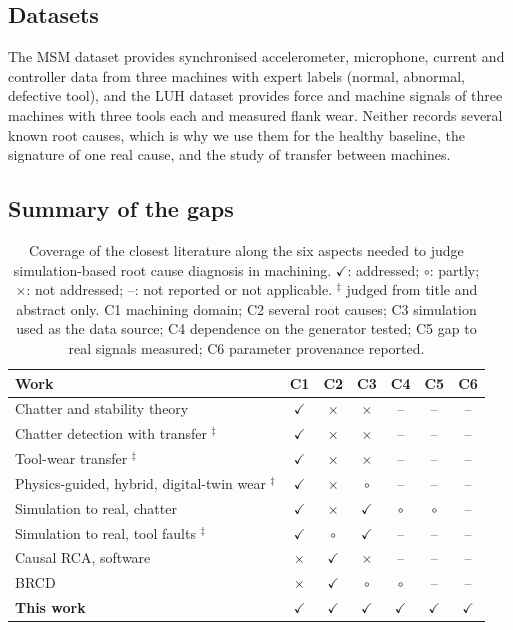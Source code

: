 \documentclass[11pt]{article}
\newcommand{\cmark}{$\checkmark$}
\newcommand{\xmark}{$\times$}
\newcommand{\pmark}{$\circ$}
\begin{document}
\subsection{Datasets}
The MSM dataset \citep{kim2026msm} provides synchronised accelerometer, microphone, current and controller data from three machines with expert labels (normal, abnormal, defective tool), and the LUH dataset \citep{denkena2023luh} provides force and machine signals of three machines with three tools each and measured flank wear.
Neither records several known root causes, which is why we use them for the healthy baseline, the signature of one real cause, and the study of transfer between machines.

\subsection{Summary of the gaps}
\begin{table}[t]\centering\footnotesize
\caption{Coverage of the closest literature along the six aspects needed to judge simulation-based root cause diagnosis in machining. \cmark: addressed; \pmark: partly; \xmark: not addressed; --: not reported or not applicable. $^{\ddagger}$ judged from title and abstract only. C1 machining domain; C2 several root causes; C3 simulation used as the data source; C4 dependence on the generator tested; C5 gap to real signals measured; C6 parameter provenance reported.}\label{tab:gap}
\begin{tabular}{p{5.6cm}cccccc}\toprule
Work & C1 & C2 & C3 & C4 & C5 & C6\\\midrule
Chatter and stability theory \citep{altintas2020} & \cmark & \xmark & \xmark & -- & -- & --\\
Chatter detection with transfer \citep{yesilli2022tlchatter}$^{\ddagger}$ & \cmark & \xmark & \xmark & -- & -- & --\\
Tool-wear transfer \citep{wang2020datwear,li2023metadg}$^{\ddagger}$ & \cmark & \xmark & \xmark & -- & -- & --\\
Physics-guided, hybrid, digital-twin wear \citep{li2025physguided,yang2022hybridwear,han2025dtmech}$^{\ddagger}$ & \cmark & \xmark & \pmark & -- & -- & --\\
Simulation to real, chatter \citep{alberts2024sim2real} & \cmark & \xmark & \cmark & \pmark & \pmark & --\\
Simulation to real, tool faults \citep{ebrahimi2023smartfaults}$^{\ddagger}$ & \cmark & \pmark & \cmark & -- & -- & --\\
Causal RCA, software \citep{ikram2022rcd,ikram2025rcg,pham2024baro,fang2025simplerca,orchard2025} & \xmark & \cmark & \xmark & -- & -- & --\\
BRCD \citep{lee2026brcd} & \xmark & \cmark & \pmark & \pmark & -- & --\\\midrule
\textbf{This work} & \cmark & \cmark & \cmark & \cmark & \cmark & \cmark\\\bottomrule
\end{tabular}
\end{table}
\end{document}
